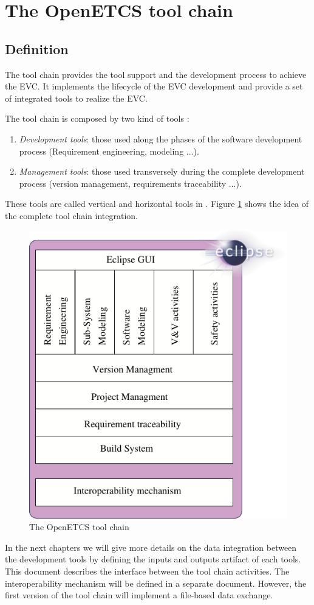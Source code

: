 \section{The OpenETCS tool chain}
\subsection{Definition}
The tool chain provides the tool support and the development process
to achieve the \gls{EVC}. It implements the lifecycle of the EVC
development and provide a set of integrated tools to realize the
\gls{EVC}.


The tool chain is composed by two kind of tools :
\begin{enumerate}
\item {\it Development tools}: those used along the phases of the software
  development process (Requirement engineering, modeling ...).
\item {\it Management tools}:  those used transversely during the
  complete development process (version management, requirements
  traceability ...).
\end{enumerate}
These tools are called vertical and horizontal tools in
\cite{wasserman_tool_1990}. 
Figure \ref{fig:toolchain} shows the idea of the complete tool chain
integration.

\begin{figure}[htbp]
\centering
  \includegraphics[width=.5\textwidth]{images/toolchain_archi-dev}
  \caption{The OpenETCS tool chain}
  \label{fig:toolchain}
\end{figure}

In the next chapters  we will give more details on the
data integration between the development tools by defining the inputs
and outputs artifact of each tools. This document describes the
interface between the tool chain activities.
The interoperability mechanism will be defined in a separate
document. However, the first version of the tool chain will implement a
file-based data exchange.
 
